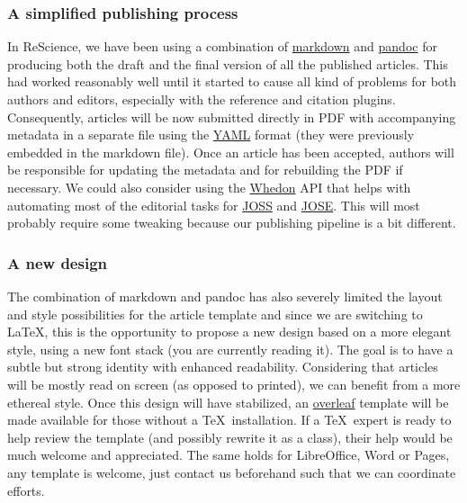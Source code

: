 \subsubsection{A simplified publishing process}

In ReScience, we have been using a combination of
\href{https://daringfireball.net/projects/markdown/syntax}{markdown} and
\href{http://pandoc.org/}{pandoc} for producing both the draft and the final
version of all the published articles. This had worked reasonably well until it
started to cause all kind of problems for both authors and editors, especially
with the reference and citation plugins. Consequently, articles will be now
submitted directly in PDF with accompanying metadata in a separate file using
the \href{https://en.wikipedia.org/wiki/YAML}{YAML} format (they were
previously embedded in the markdown file). Once an article has been accepted,
authors will be responsible for updating the metadata and for rebuilding the PDF if
necessary. We could also consider using the
\href{https://github.com/openjournals/whedon}{Whedon} API that helps with automating
most of the editorial tasks for \href{http://joss.theoj.org/}{JOSS} and
\href{http://jose.theoj.org/}{JOSE}. This will most probably require some
tweaking because our publishing pipeline is a bit different.


\subsubsection{A new design}

The combination of markdown and pandoc has also severely limited the layout and
style possibilities for the article template and since we are switching to
\LaTeX, this is the opportunity to propose a new design based on a more elegant
style, using a new font stack\supercite{SourceSerifPro:2014, Roboto:2011,
  SourceCodePro:2012} (you are currently reading it). The goal is to have a
subtle but strong identity with enhanced readability. Considering that articles
will be mostly read on screen (as opposed to printed), we can benefit from a
more ethereal style. Once this design will have stabilized, an
\href{https://www.overleaf.com/}{overleaf} template will be made available for
those without a \TeX~installation. If a \TeX~expert is ready to help review
the template (and possibly rewrite it as a class), their help would be much
welcome and appreciated. The same holds for LibreOffice, Word or Pages, any
template is welcome, just contact us beforehand such that we can coordinate
efforts.


